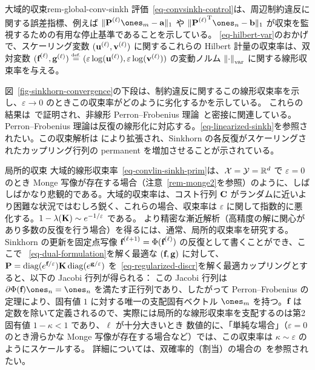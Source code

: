 \begin{rem11}{大域的収束}{rem-global-conv-sinkh}
評価~\eqref{eq-convsinkh-control}は、周辺制約違反に関する誤差指標、例えば $\| \it{\P} \ones_m - \a \|_1$ や $\|\transp{\it{\P}} \ones_n - \b \|_1$ が収束を監視するための有用な停止基準であることを示している。
\eqref{eq-hilbert-var}のおかげで、スケーリング変数 $(\mathrm{\textbf{u}}^{(\ell)},\mathrm{\textbf{v}}^{(\ell)})$ に関するこれらの Hilbert 計量の収束率は、双対変数 $(\mathrm{\textbf{f}}^{(\ell)},\mathrm{\textbf{g}}^{(\ell)}) \stackrel{\mbox{\upshape\tiny def.}}{=} (\varepsilon\log(\mathrm{\textbf{u}}^{(\ell)}),\varepsilon\log(\mathrm{\textbf{v}}^{(\ell)}))$ の変動ノルム $\left\| \cdot \right\|_{\text{var}}$ に関する線形収束率を与える。

図~\ref{fig-sinkhorn-convergence}の下段は、制約違反に関するこの線形収束率を示し、$\varepsilon\rightarrow 0$ のときこの収束率がどのように劣化するかを示している。
これらの結果は~\citep{franklin1989scaling}で証明され、非線形 Perron--Frobenius 理論~\citep{lemmens2012nonlinear}と密接に関連している。Perron--Frobenius 理論は反復の線形化に対応する。\eqref{eq-linearized-sinkh}を参照されたい。この収束解析は \citep{linial1998deterministic} により拡張され、Sinkhorn の各反復がスケーリングされたカップリング行列の permanent を増加させることが示されている。
\end{rem11}



\begin{rem1}{局所的収束}\label{rem-local-conv}
大域的線形収束率~\eqref{eq-convlin-sinkh-prim}は、$\mathcal{X}=\mathcal{Y}=\mathbb{R}^d$ で $\varepsilon=0$ のとき Monge 写像が存在する場合（注意~\ref{rem-monge2}を参照）のように、しばしばかなり悲観的である。大域的収束率は、コスト行列 $\mathrm{\textbf{C}}$ がランダムに近いより困難な状況ではむしろ鋭く、これらの場合、収束率は $\varepsilon$ に関して指数的に悪化する。$1-\lambda(\mathrm{\textbf{K}}) \sim e^{-1/\varepsilon}$ である。
より精密な漸近解析（\eg 高精度の解に関心があり多数の反復を行う場合）を得るには、通常、局所的収束率を研究する。
Sinkhorn の更新を固定点写像 $\mathrm{\textbf{f}}^{(\ell+1)} = \Phi( \mathrm{\textbf{f}}^{(\ell)} )$ の反復として書くことができ、ここで
~\eqref{eq-dual-formulation}を解く最適な $(\mathrm{\textbf{f}},\mathrm{\textbf{g}})$ に対して、$\mathrm{\textbf{P}} = \operatorname{diag}(e^{\mathrm{\textbf{f}}/\varepsilon}) \mathrm{\textbf{K}} \operatorname{diag}(e^{\mathrm{\textbf{g}}/\varepsilon})$ を~\eqref{eq-regularized-discr}を解く最適カップリングとすると、以下の Jacobi 行列が得られる：
この Jacobi 行列は $\partial \Phi(\fD) \ones_n = \ones_n$ を満たす正行列であり、したがって Perron--Frobenius の定理により、固有値 $1$ に対する唯一の支配固有ベクトル $\ones_m$ を持つ。$\mathrm{\textbf{f}}$ は定数を除いて定義されるので、実際には局所的な線形収束率を支配するのは第2固有値 $1-\kappa<1$ であり、$\ell$ が十分大きいとき
数値的に、「単純な場合」（$\varepsilon=0$ のとき滑らかな Monge 写像が存在する場合など）では、この収束率は $\kappa \sim \varepsilon$ のようにスケールする。
詳細については、双確率的（割当）の場合の~\citep{knight2008sinkhorn}を参照されたい。
\end{rem1}







